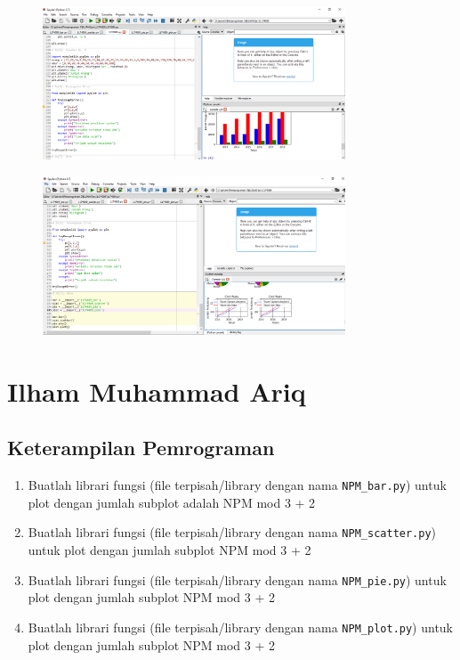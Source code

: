\begin{figure}[H]
	\includegraphics[width=9cm]{figures/6/1174089/Praktek/c9.png}
	\centering
\end{figure}
\begin{figure}[H]
	\includegraphics[width=9cm]{figures/6/1174089/Praktek/c10.png}
	\centering
\end{figure}

\section{Ilham Muhammad Ariq}
\subsection{Keterampilan Pemrograman}
\begin{enumerate}
\item Buatlah librari fungsi (file terpisah/library dengan nama \verb|NPM_bar.py|) untuk plot dengan jumlah subplot adalah NPM mod 3 + 2

	
	
\item Buatlah librari fungsi (file terpisah/library dengan nama \verb|NPM_scatter.py|) untuk plot dengan jumlah subplot NPM mod 3 + 2

	

\item Buatlah librari fungsi (file terpisah/library dengan nama \verb|NPM_pie.py|) untuk plot dengan jumlah subplot NPM mod 3 + 2

	
	
\item  Buatlah librari fungsi (file terpisah/library dengan nama \verb|NPM_plot.py|) untuk plot dengan jumlah subplot NPM mod 3 + 2

	
	 
\end{enumerate}

